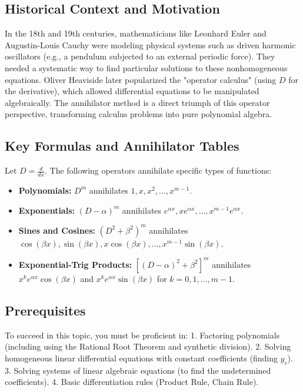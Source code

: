 \documentclass[11pt]{article}
\begin{document}
\subsection{Historical Context and Motivation}
In the 18th and 19th centuries, mathematicians like Leonhard Euler and Augustin-Louis Cauchy were modeling physical systems such as driven harmonic oscillators (e.g., a pendulum subjected to an external periodic force). They needed a systematic way to find particular solutions to these nonhomogeneous equations. Oliver Heaviside later popularized the "operator calculus" (using $D$ for the derivative), which allowed differential equations to be manipulated algebraically. The annihilator method is a direct triumph of this operator perspective, transforming calculus problems into pure polynomial algebra.

\subsection{Key Formulas and Annihilator Tables}
Let $D = \frac{d}{dx}$. The following operators annihilate specific types of functions:
\begin{itemize}
    \item \textbf{Polynomials:} $D^m$ annihilates $1, x, x^2, \dots, x^{m-1}$.
    \item \textbf{Exponentials:} $(D - \alpha)^m$ annihilates $e^{\alpha x}, x e^{\alpha x}, \dots, x^{m-1} e^{\alpha x}$.
    \item \textbf{Sines and Cosines:} $(D^2 + \beta^2)^m$ annihilates $\cos(\beta x), \sin(\beta x), x \cos(\beta x), \dots, x^{m-1} \sin(\beta x)$.
    \item \textbf{Exponential-Trig Products:} $[(D - \alpha)^2 + \beta^2]^m$ annihilates $x^k e^{\alpha x} \cos(\beta x)$ and $x^k e^{\alpha x} \sin(\beta x)$ for $k = 0, 1, \dots, m-1$.
\end{itemize}

\subsection{Prerequisites}
To succeed in this topic, you must be proficient in:
1. Factoring polynomials (including using the Rational Root Theorem and synthetic division).
2. Solving homogeneous linear differential equations with constant coefficients (finding $y_c$).
3. Solving systems of linear algebraic equations (to find the undetermined coefficients).
4. Basic differentiation rules (Product Rule, Chain Rule).
\end{document}

